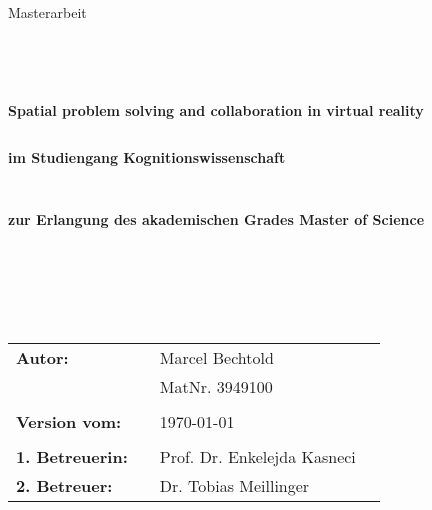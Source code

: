 \begin{center}
\Large{Masterarbeit}
\end{center}
\begin{verbatim}




\end{verbatim}
\begin{center}
\doublespacing
\textbf{\LARGE{Spatial problem solving and collaboration in virtual reality}}\\
\singlespacing
\begin{verbatim}

\end{verbatim}
\textbf{im Studiengang Kognitionswissenschaft}
\end{center}
\begin{verbatim}

\end{verbatim}
\begin{center}

\end{center}
\begin{verbatim}

\end{verbatim}
\begin{center}
\textbf{zur Erlangung des akademischen Grades Master of Science}
\end{center}
\begin{verbatim}






\end{verbatim}
\begin{flushleft}
\begin{tabular}{llll}
\textbf{Autor:} & & Marcel Bechtold& \\
& & MatNr. 3949100 & \\
& & \\
\textbf{Version vom:} & & \today &\\
& & \\
\textbf{1. Betreuerin:} & & Prof. Dr. Enkelejda Kasneci &\\
\textbf{2. Betreuer:} & & Dr. Tobias Meillinger &\\
\end{tabular}
\end{flushleft}